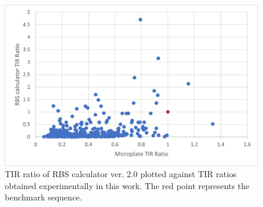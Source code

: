 \documentclass{scrartcl}[2013/05/29]%
\begin{document}
\begin{figure}
    \centering
    \includegraphics[scale = 0.6]{paper/plots/Supplementary/TIR_ratio_salis_micro.png}
    \caption{TIR ratio of RBS calculator ver. 2.0 \cite{Salis2009} plotted against TIR ratios obtained experimentally in this work. The red point represents the benchmark sequence.}
    \label{fig:TIR ratio salis micro}
\end{figure}
\end{document}
